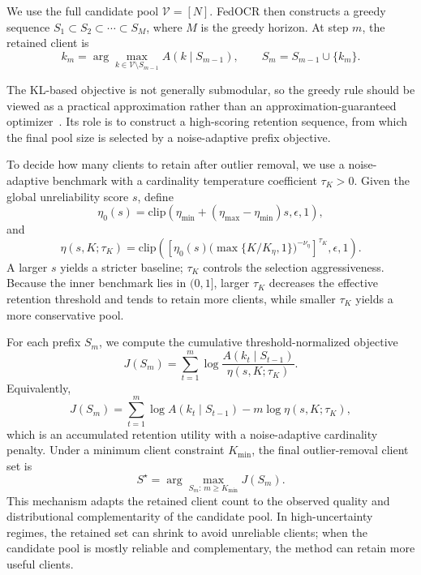 ﻿\documentclass[conference]{IEEEtran}
\theoremstyle{definition}
\theoremstyle{remark}
\begin{document}
We use the full candidate pool $\mathcal V=[N]$.
FedOCR then constructs a greedy sequence $S_1\subset S_2\subset\cdots\subset S_M$, where $M$ is the greedy horizon.
At step $m$, the retained client is
\begin{equation}
\label{eq:greedy_step}
k_m
=
\arg\max_{k\in\mathcal V\setminus S_{m-1}}
A(k\mid S_{m-1}),
\qquad
S_m=S_{m-1}\cup\{k_m\}.
\end{equation}

The KL-based objective is not generally submodular, so the greedy rule should be viewed as a practical approximation rather than an approximation-guaranteed optimizer~\cite{nemhauser1978submodular,krause2014submodular}.
Its role is to construct a high-scoring retention sequence, from which the final pool size is selected by a noise-adaptive prefix objective.

To decide how many clients to retain after outlier removal, we use a noise-adaptive benchmark with a cardinality temperature coefficient $\tau_K>0$.
Given the global unreliability score $s$, define
\[
\eta_0(s)=\mathrm{clip}(\eta_{\min}+(\eta_{\max}-\eta_{\min})s,\epsilon,1),
\]
and
\begin{equation}
\label{eq:eta_temp}
\eta(s,K;\tau_K)
=
\mathrm{clip}\!\left(
\left[
\eta_0(s)\bigl(\max\{K/K_\eta,1\}\bigr)^{-\nu_\eta}
\right]^{\tau_K},
\epsilon,1
\right).
\end{equation}
A larger $s$ yields a stricter baseline; $\tau_K$ controls the selection aggressiveness.
Because the inner benchmark lies in $(0,1]$, larger $\tau_K$ decreases the effective retention threshold and tends to retain more clients, while smaller $\tau_K$ yields a more conservative pool.

For each prefix $S_m$, we compute the cumulative threshold-normalized objective
\begin{equation}
\label{eq:prefix_objective}
J(S_m)
=
\sum_{t=1}^{m}
\log
\frac{
A(k_t\mid S_{t-1})
}{
\eta(s,K;\tau_K)
}.
\end{equation}
Equivalently,
\[
J(S_m)=\sum_{t=1}^{m}\log A(k_t\mid S_{t-1})-m\log\eta(s,K;\tau_K),
\]
which is an accumulated retention utility with a noise-adaptive cardinality penalty.
Under a minimum client constraint $K_{\min}$, the final outlier-removal client set is
\begin{equation}
\label{eq:variable_size_selection}
S^\star
=
\arg\max_{S_m:\,m\ge K_{\min}}
J(S_m).
\end{equation}
This mechanism adapts the retained client count to the observed quality and distributional complementarity of the candidate pool.
In high-uncertainty regimes, the retained set can shrink to avoid unreliable clients; when the candidate pool is mostly reliable and complementary, the method can retain more useful clients.
\end{document}
